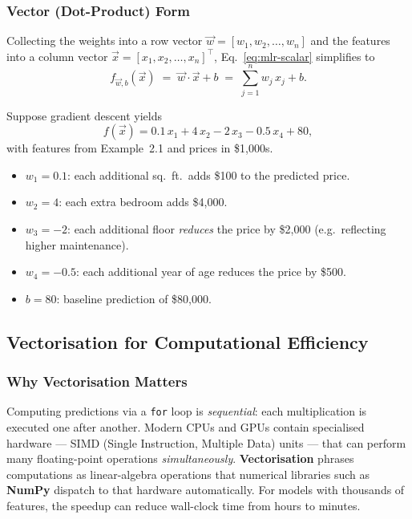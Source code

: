 \subsubsection{Vector (Dot-Product) Form}

Collecting the weights into a row vector
$\vec{w}=[w_1,w_2,\ldots,w_n]$ and the features into a column vector
$\vec{x}=[x_1,x_2,\ldots,x_n]^{\top}$, Eq.~\eqref{eq:mlr-scalar} simplifies
to
\begin{equation}
\boxed{f_{\vec{w},b}(\vec{x})
\;=\; \vec{w}\cdot\vec{x}+b
\;=\; \sum_{j=1}^{n}w_j\,x_j+b.}
\label{eq:mlr-vec}
\end{equation}

\begin{example}
Suppose gradient descent yields
\[
f(\vec{x})=0.1\,x_1+4\,x_2-2\,x_3-0.5\,x_4+80,
\]
with features from Example~2.1 and prices in \$1{,}000s.
\begin{itemize}
\item $w_1=0.1$: each additional sq.\ ft.\ adds \$100 to the predicted price.
\item $w_2=4$: each extra bedroom adds \$4{,}000.
\item $w_3=-2$: each additional floor \emph{reduces} the price by \$2{,}000
  (e.g.\ reflecting higher maintenance).
\item $w_4=-0.5$: each additional year of age reduces the price by \$500.
\item $b=80$: baseline prediction of \$80{,}000.
\end{itemize}
\end{example}

\subsection{Vectorisation for Computational Efficiency}

\subsubsection{Why Vectorisation Matters}

Computing predictions via a \texttt{for} loop is \emph{sequential}: each
multiplication is executed one after another. Modern CPUs and GPUs contain
specialised hardware --- SIMD (Single Instruction, Multiple Data) units ---
that can perform many floating-point operations \emph{simultaneously}.
\textbf{Vectorisation} phrases computations as linear-algebra operations that
numerical libraries such as \textbf{NumPy} dispatch to that hardware
automatically. For models with thousands of features, the speedup can reduce
wall-clock time from hours to minutes.

